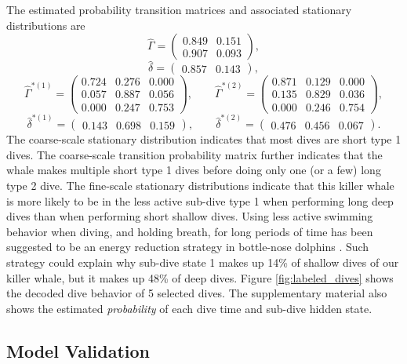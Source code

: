 The estimated probability transition matrices and associated stationary distributions are
%
$$\hat \Gamma = \begin{pmatrix} 
0.849  &  0.151 \\
0.907  &  0.093
\end{pmatrix},$$
$$\hat \delta = \begin{pmatrix} 0.857 & 0.143 \end{pmatrix},$$
%
$$\hat \Gamma^{*(1)} = \begin{pmatrix} 
0.724 & 0.276 & 0.000 \\
0.057 & 0.887 & 0.056 \\
0.000 & 0.247 & 0.753
\end{pmatrix}, \qquad 
\hat \Gamma^{*(2)} = \begin{pmatrix} 
0.871 & 0.129 & 0.000 \\
0.135 & 0.829 & 0.036 \\
0.000 & 0.246 & 0.754
\end{pmatrix},$$
$$\hat \delta^{*(1)} = \begin{pmatrix} 0.143 & 0.698 & 0.159 \end{pmatrix}, \qquad
\hat \delta^{*(2)} = \begin{pmatrix} 0.476 & 0.456 & 0.067 \end{pmatrix}.$$
%
The coarse-scale stationary distribution indicates that most dives are short type 1 dives. The coarse-scale transition probability matrix further indicates that the whale makes multiple short type 1 dives before doing only one (or a few) long type 2 dive. The fine-scale stationary distributions indicate that this killer whale is more likely to be in the less active sub-dive type 1 when performing long deep dives than when performing short shallow dives. Using less active swimming behavior when diving, and holding breath, for long periods of time has been suggested to be an energy reduction strategy in bottle-nose dolphins \citep{Williams:1999}. Such strategy could explain why sub-dive state 1 makes up 14\% of shallow dives of our killer whale, but it makes up 48\% of deep dives. Figure \ref{fig:labeled_dives} shows the decoded dive behavior of 5 selected dives. The supplementary material also shows the estimated \textit{probability} of each dive time and sub-dive hidden state.

\subsection{Model Validation}
\label{subsec:model_validation}

